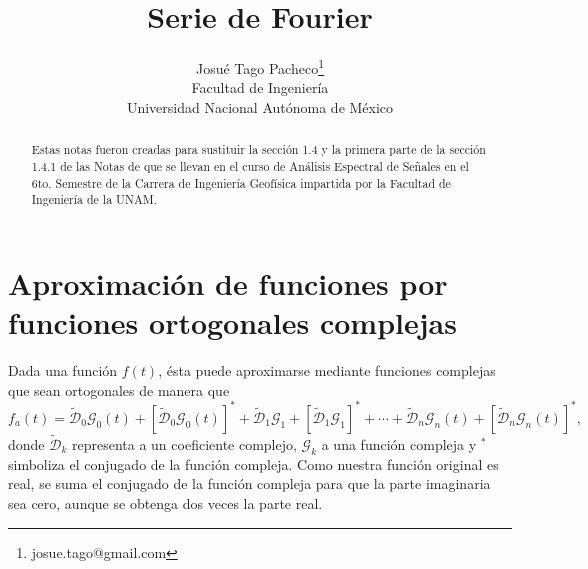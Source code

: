 \documentclass{article}
\title{Serie de Fourier}
\author[1]{Josué Tago Pacheco\thanks{josue.tago@gmail.com}\\
Facultad de Ingeniería\\
Universidad Nacional Autónoma de México}
\begin{document}
\maketitle

\begin{abstract}
Estas notas fueron creadas para sustituir la sección 1.4 y la primera parte de la sección 1.4.1 de las Notas de \citet{Anguiano_1996_IAF} que se llevan en el curso de An\'alisis Espectral de Señales en el 6to. Semestre de la Carrera de Ingenier\'ia Geof\'isica impartida por la Facultad de Ingenier\'ia de la UNAM. 
\end{abstract}

\section*{Aproximaci\'on de funciones por funciones ortogonales complejas}
Dada una funci\'on $f(t)$, \'esta puede aproximarse mediante funciones complejas que sean ortogonales de manera que
\begin{equation}
f_a(t)=\tilde{\mathscr{D}}_0\mathscr{G}_0(t)+[\tilde{\mathscr{D}}_0\mathscr{G}_0(t)]^*+\tilde{\mathscr{D}}_1\mathscr{G}_1+[\tilde{\mathscr{D}}_1 \mathscr{G}_1]^*+\cdots+\tilde{\mathscr{D}}_n\mathscr{G}_n(t)+[\tilde{\mathscr{D}}_n\mathscr{G}_n(t)]^*, \label{eq:fa}
\end{equation} 
donde $\tilde{\mathscr{D}}_k$ representa a un coeficiente complejo, $\mathscr{G}_k$ a una funci\'on compleja y $^*$ simboliza el conjugado de la funci\'on compleja. Como nuestra funci\'on original es real, se suma el conjugado de la funci\'on compleja para que la parte imaginaria sea cero, aunque se obtenga dos veces la parte real.
\end{document}
